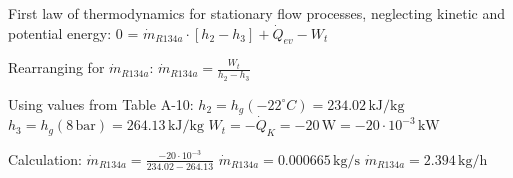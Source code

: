 First law of thermodynamics for stationary flow processes, neglecting kinetic and potential energy:  
0 = \( \dot{m}_{R134a} \cdot [h_2 - h_3] + \dot{Q}_{ev} - W_t \)  

Rearranging for \( \dot{m}_{R134a} \):  
\( \dot{m}_{R134a} = \frac{W_t}{h_2 - h_3} \)  

Using values from Table A-10:  
\( h_2 = h_g(-22^\circ C) = 234.02 \, \text{kJ/kg} \)  
\( h_3 = h_g(8 \, \text{bar}) = 264.13 \, \text{kJ/kg} \)  
\( W_t = -\dot{Q}_K = -20 \, \text{W} = -20 \cdot 10^{-3} \, \text{kW} \)  

Calculation:  
\( \dot{m}_{R134a} = \frac{-20 \cdot 10^{-3}}{234.02 - 264.13} \)  
\( \dot{m}_{R134a} = 0.000665 \, \text{kg/s} \)  
\( \dot{m}_{R134a} = 2.394 \, \text{kg/h} \)